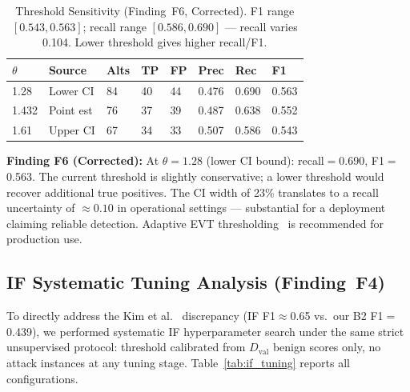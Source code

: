 \documentclass[journal,10pt,twoside]{IEEEtran}
\newcommand{\dval}{$D_{\mathrm{val}}$}
\begin{document}
\begin{table}[t]
\caption{Threshold Sensitivity (Finding~F6, Corrected).
  F1 range $[0.543,0.563]$; recall range $[0.586,0.690]$ ---
  recall varies 0.104. Lower threshold gives higher recall/F1.}
\label{tab:threshold}
\centering\small
\begin{tabular}{@{}P{0.75cm}L{1.75cm}P{0.6cm}P{0.5cm}P{0.5cm}
                   P{0.6cm}P{0.6cm}P{0.55cm}@{}}
\toprule
$\theta$ & Source & Alts & TP & FP & Prec & Rec & F1 \\
  & Lower CI  & 84 & 40 & 44 & 0.476 & 0.690 & 0.563 \\
1.432 & Point est & 76 & 37 & 39 & 0.487 & 0.638 & 0.552 \\
1.61  & Upper CI  & 67 & 34 & 33 & 0.507 & 0.586 & 0.543 \\
\bottomrule
\end{tabular}
\end{table}

\noindent\textbf{Finding F6 (Corrected):} At $\theta{=}1.28$
(lower CI bound): recall$=$0.690, F1$=$0.563.  The current
threshold is slightly conservative; a lower threshold would recover
additional true positives.  The CI width of 23\% translates to a
recall uncertainty of ${\approx}0.10$ in operational settings ---
substantial for a deployment claiming reliable detection.  Adaptive
EVT thresholding~\cite{siffer2017evt,zhao2023evt} is recommended for
production use.

\subsection{IF Systematic Tuning Analysis (Finding~F4)}
\label{sec:results_if}
To directly address the Kim et al.~\cite{kim2023unsupervised}
discrepancy (IF F1$\approx$0.65 vs.\ our B2 F1$=$0.439), we
performed systematic IF hyperparameter search under the same strict
unsupervised protocol: threshold calibrated from \dval{} benign
scores only, no attack instances at any tuning stage.
Table~\ref{tab:if_tuning} reports all configurations.
\end{document}
